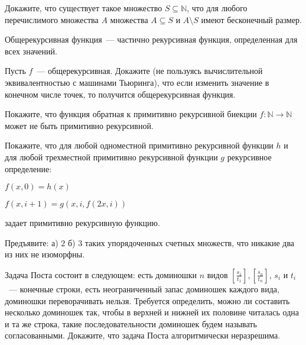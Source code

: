 
\newcommand{\dom}[2]{\left[\frac{#1}{#2}\right]}


\begin{task}
    Докажите, что существует такое множество $S \subseteq \mathbb{N}$, что для любого перечислимого множества $A$ множества $A
    \subseteq S$ и $A \setminus S$ имеют бесконечный размер.
\end{task}

Общерекурсивная функция~--- частично рекурсивная функция, определенная для всех значений.

\begin{task}
    Пусть $f$~--- общерекурсивная. Докажите (не пользуясь вычислительной эквивалентностью с машинами Тьюринга), что если изменить
    значение в конечном числе точек, то получится общерекурсивная функция.
\end{task}

\begin{task}
    Покажите, что функция обратная к примитивно рекурсивной биекции $f: \mathbb{N} \rightarrow \mathbb{N}$ может не быть
    примитивно рекурсивной.
\end{task}

\begin{task}
    Покажите, что для любой одноместной примитивно рекурсивной функции $h$ и для любой трехместной примитивно рекурсивной функции
    $g$ рекурсивное определение:

    $f(x, 0) = h(x)$

    $f(x, i + 1) = g(x, i, f(2 x, i))$

    задает примитивно рекурсивную функцию.
\end{task}

\begin{task}
	Предъявите: а) $2$ б) $3$ таких упорядоченных счетных множеств, что никакие два из них не изоморфны.
\end{task}

\breakline

\begin{ptask}{21}
	Задача Поста состоит в следующем: есть доминошки $n$ видов $\dom{s_1}{t_1}, \dom{s_n}{t_n}$, $s_i$ и $t_i$~--- конечные
    строки, есть неограниченный запас доминошек каждого вида, доминошки переворачивать нельзя. Требуется определить, можно ли
    составить несколько доминошек так, чтобы в верхней и нижней их половине читалась одна и та же строка, такие последовательности
    доминошек будем называть согласованными. Докажите, что задача Поста алгоритмически неразрешима.
\end{ptask}